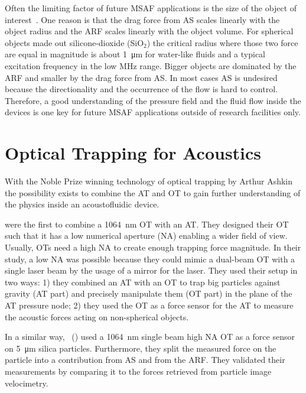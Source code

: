 Often the limiting factor of future MSAF applications is the size of the object 
of interest~\cite{Barnkob2012}. One reason is that the drag force from AS 
scales linearly with the object radius and the ARF scales linearly with the 
object volume. For spherical objects made out silicone-dioxide (SiO$_{2}$) the 
critical radius where those two force are equal in magnitude is about 
\SI{1}{\um} for water-like fluids and a typical excitation frequency in the low 
\si{\mega\hertz} range. Bigger objects are dominated by the ARF and smaller by 
the drag force from AS. In most cases AS is undesired because the 
directionality and the occurrence of the flow is hard to control. Therefore, a 
good understanding of the pressure field and the fluid flow inside the devices 
is one key for future MSAF applications outside of research facilities only.

\section{Optical Trapping for Acoustics}

With the Noble Prize winning technology of optical trapping by Arthur 
Ashkin~\cite{Ashkin1978,Ashkin1987,Ashkin2002,Ashkin1986,Ashkin1992,Ashkin1997} 
the possibility exists to combine the AT and OT to gain further understanding 
of the physics inside an acoustofluidic device.

 were the first to combine a \SI{1064}{\nm} OT with an 
AT. They designed their OT such that it has a low numerical aperture (NA) 
enabling a wider field of view. Usually, OTs need a high NA to create enough 
trapping force magnitude. In their study, a low NA was possible because they 
could mimic a dual-beam OT with a single laser beam by the usage of a mirror 
for the laser. They used their setup in two ways: 1) they combined an AT with 
an OT to trap big particles against gravity (AT part) and precisely manipulate 
them (OT part) in the plane of the AT pressure node; 2) they used the OT as a 
force sensor for the AT to measure the acoustic forces acting on non-spherical 
objects.

In a similar way, ~(\citeyear{Bassindale2014}) used a 
\SI{1064}{\nm} single beam high NA OT as a force sensor on \SI{5}{\um} silica 
particles. Furthermore, they split the measured force on the particle into a 
contribution from AS and from the ARF. They validated their measurements by 
comparing it to the forces retrieved from particle image velocimetry.

